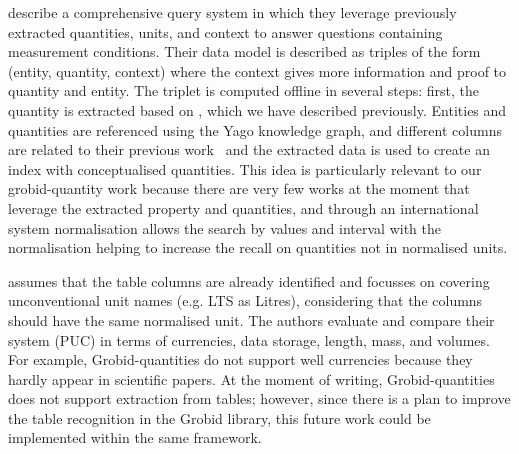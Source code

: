 \cite{ho2021qute} describe a comprehensive query system in which they leverage previously extracted quantities, units, and context to answer questions containing measurement conditions. 
Their data model is described as triples of the form (entity, quantity, context) where the context gives more information and proof to quantity and entity. 
The triplet is computed offline in several steps: first, the quantity is extracted based on \cite{roy2015reasoning}, which we have described previously. 
Entities and quantities are referenced using the Yago knowledge graph, and different columns are related to their previous work~\cite{ho2021extracting} and the extracted data is used to create an index with conceptualised quantities. 
This idea is particularly relevant to our grobid-quantity work because there are very few works at the moment that leverage the extracted property and quantities, and through an international system normalisation allows the search by values and interval with the normalisation helping to increase the recall on quantities not in normalised units. 

\cite{taha2021identifying} assumes that the table columns are already identified and focusses on covering unconventional unit names (e.g. LTS as Litres), considering that the columns should have the same normalised unit. The authors evaluate and compare their system (PUC) in terms of currencies, data storage, length, mass, and volumes. For example, Grobid-quantities do not support well currencies because they hardly appear in scientific papers. At the moment of writing, Grobid-quantities does not support extraction from tables; however, since there is a plan to improve the table recognition in the Grobid library, this future work could be implemented within the same framework. 





